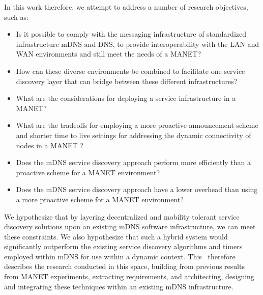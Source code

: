 In this work therefore, we attempt to address a number of research objectives, such as:

\begin{itemize}

\item Is it possible to comply with the messaging infrastructure of standardized infrastructure mDNS and DNS, to provide interoperability with the LAN and WAN environments and still meet the needs of a MANET? 
\item How can these diverse environments be combined to facilitate one service discovery layer that can bridge between these different infrastructures?
\item What are the considerations for deploying a service infrastructure in a MANET?
\item What are the tradeoffs for employing a more proactive announcement scheme and shorter time to live settings for addressing the dynamic connectivity of nodes in a MANET ? 
\item Does the mDNS service discovery approach perform more efficiently than a proactive scheme for a MANET environment? 
\item Does the mDNS service discovery approach have a lower overhead than using a more proactive scheme for a  MANET environment? 
\end{itemize}

We hypothesize that by layering decentralized and mobility tolerant service discovery solutions upon an existing mDNS software infrastructure, we can meet these constraints. We also hypothesize that such a hybrid system would significantly outperform the existing service discovery algorithms and timers employed within mDNS for use within a dynamic context.  This \doctype~therefore describes the  research conducted in this space, building from previous results from MANET experiments, extracting requirements, and architecting, designing and integrating these techniques within an existing mDNS infrastructure.  

